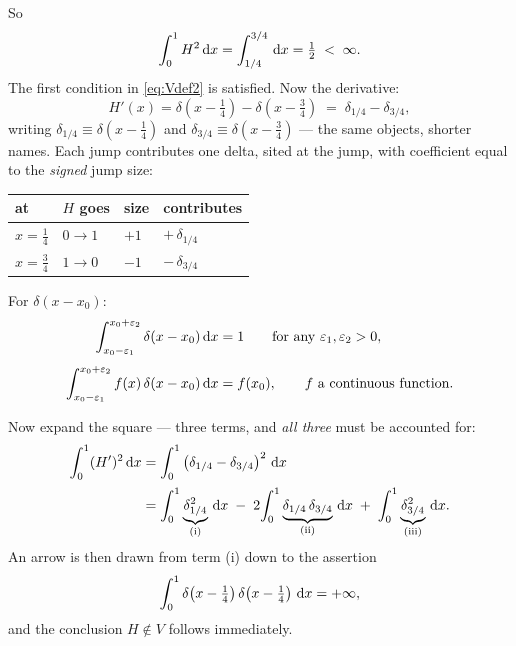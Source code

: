 So
\begin{equation}
  \int_{0}^{1} H^{2}\,\mathrm{d} x = \int_{1/4}^{3/4}\,\mathrm{d} x = \tfrac12 \;<\;\infty .
\end{equation}
The first condition in \eqref{eq:Vdef2} is satisfied. Now the derivative:
\begin{equation}\label{eq:Hprime}
  H'(x) = \delta\!\left(x-\tfrac14\right) - \delta\!\left(x-\tfrac34\right)
        \;=\; \delta_{1/4} - \delta_{3/4},
\end{equation}
writing $\delta_{1/4}\equiv\delta(x-\tfrac14)$ and
$\delta_{3/4}\equiv\delta(x-\tfrac34)$ --- the same objects, shorter names.
Each jump contributes one delta, sited at the jump, with coefficient equal to
the \emph{signed} jump size:
\begin{center}\small
\renewcommand{\arraystretch}{1.2}
\begin{tabular}{@{}llll@{}}
\toprule
\textbf{at} & \textbf{$H$ goes} & \textbf{size} & \textbf{contributes}\\
\midrule
$x=\tfrac14$ & $0\to1$ & $+1$ & $+\,\delta_{1/4}$\\
$x=\tfrac34$ & $1\to0$ & $-1$ & $-\,\delta_{3/4}$\\
\bottomrule
\end{tabular}
\end{center}

\begin{recall}
For $\delta(x-x_{0})$:
\begin{align}
  \int_{x_{0}-\varepsilon_{1}}^{x_{0}+\varepsilon_{2}} \delta(x-x_{0})\,\mathrm{d} x &= 1
    \qquad\text{for any }\varepsilon_{1},\varepsilon_{2}>0, \label{eq:delta1}\\[4pt]
  \int_{x_{0}-\varepsilon_{1}}^{x_{0}+\varepsilon_{2}} f(x)\,\delta(x-x_{0})\,\mathrm{d} x &= f(x_{0}),
    \qquad f \text{ a continuous function.} \label{eq:delta2}
\end{align}
\end{recall}

Now expand the square --- three terms, and \emph{all three} must be accounted
for:
\begin{align}\label{eq:Hsq}
  \int_{0}^{1}(H')^{2}\,\mathrm{d} x
    &= \int_{0}^{1}\left(\delta_{1/4}-\delta_{3/4}\right)^{2}\,\mathrm{d} x \notag\\[2pt]
    &= \int_{0}^{1}\underbrace{\delta_{1/4}^{2}}_{\text{(i)}}\,\mathrm{d} x
       \;-\;2\!\int_{0}^{1}\underbrace{\delta_{1/4}\,\delta_{3/4}}_{\text{(ii)}}\,\mathrm{d} x
       \;+\;\int_{0}^{1}\underbrace{\delta_{3/4}^{2}}_{\text{(iii)}}\,\mathrm{d} x .
\end{align}
An arrow is then drawn from term (i) down to the assertion
\begin{equation}\label{eq:sq1}
  \int_{0}^{1}\delta\!\left(x-\tfrac14\right)\delta\!\left(x-\tfrac14\right)\,\mathrm{d} x
  = +\infty ,
\end{equation}
and the conclusion $H\notin V$ follows immediately.

